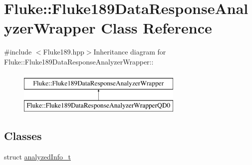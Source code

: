 \hypertarget{classFluke_1_1Fluke189DataResponseAnalyzerWrapper}{
\section{Fluke::Fluke189DataResponseAnalyzerWrapper Class Reference}
\label{classFluke_1_1Fluke189DataResponseAnalyzerWrapper}
}


{\ttfamily \#include $<$Fluke189.hpp$>$}Inheritance diagram for Fluke::Fluke189DataResponseAnalyzerWrapper::\begin{figure}[H]
\begin{center}
\leavevmode
\includegraphics[height=2cm]{classFluke_1_1Fluke189DataResponseAnalyzerWrapper}
\end{center}
\end{figure}
\subsection*{Classes}
\begin{DoxyCompactItemize}
\item 
struct \hyperlink{structFluke_1_1Fluke189DataResponseAnalyzerWrapper_1_1analyzedInfo__t}{analyzedInfo\_\-t}
\end{DoxyCompactItemize}

